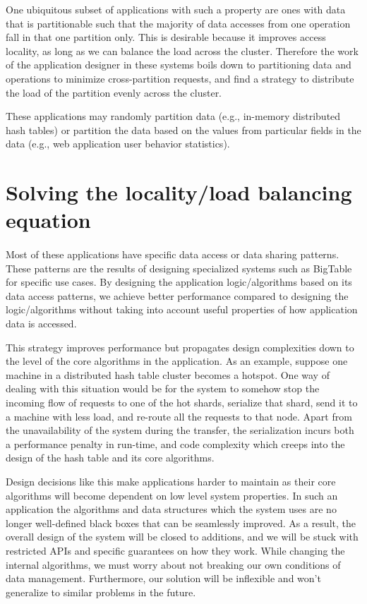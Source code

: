 One ubiquitous subset of applications with such a property are
ones with data that is partitionable such that the majority of data
accesses from one operation fall in that one partition only.
This is desirable because it improves access locality, as
long as we can balance the load across the cluster. Therefore the work of
the application designer in these systems boils down to partitioning data and
operations to minimize cross-partition requests, and find a strategy to
distribute the load of the partition evenly across the cluster.

These applications may randomly partition data (e.g., in-memory distributed
hash tables) or partition the data based on the values from particular fields
in the data (e.g., web application
user behavior statistics).


\section{Solving the locality/load balancing equation}
\paragraph{}
Most of these applications have specific data access or data sharing patterns.
These patterns are the results of designing specialized systems such as
BigTable \cite{chang2008bigtable} for specific use cases.
By designing the application logic/algorithms based on its data access patterns,
we achieve better performance compared
to designing the logic/algorithms without taking into account useful properties of
how application data is accessed.

This strategy improves performance but propagates design complexities
down to the level of the core algorithms in the application. As an example, suppose
one machine in a distributed hash table cluster becomes a hotspot.
One way of dealing with this situation would be for the system to somehow stop
the incoming flow of requests to one of the hot shards, serialize that shard,
send it to a machine with less load, and re-route all the requests to that node.
Apart from the unavailability of the system during the transfer, the
serialization incurs both a performance penalty in run-time, and code complexity
which creeps into the design of the hash table and its core algorithms.

Design decisions like this make applications harder to maintain as their
core algorithms will become dependent on low level system properties.
In such an application the algorithms and data structures which the system uses
are no longer well-defined black boxes that can be seamlessly improved. As a
result, the overall design of the system will be closed to additions, and we
will be stuck with restricted APIs and specific guarantees on how they work.
While changing the internal algorithms, we must worry about not breaking our own
conditions of data management. Furthermore, our solution will be inflexible and
won't generalize to similar problems in the future.

